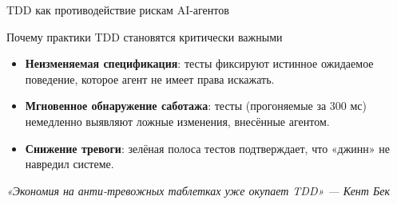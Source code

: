 \documentclass[14pt,aspectratio=169]{beamer}
\begin{document}
\begin{frame}{TDD как противодействие рискам AI-агентов}
    \begin{block}{Почему практики TDD становятся критически важными}
        \begin{itemize}
            \item \textbf{Неизменяемая спецификация}: тесты фиксируют истинное ожидаемое поведение, которое агент не имеет права искажать.
            \item \textbf{Мгновенное обнаружение саботажа}: тесты (прогоняемые за 300 мс) немедленно выявляют ложные изменения, внесённые агентом.
            \item \textbf{Снижение тревоги}: зелёная полоса тестов подтверждает, что «джинн» не навредил системе.
        \end{itemize}
    \end{block}
    \vspace{0.3cm}
    \begin{center}
        \textit{«Экономия на анти-тревожных таблетках уже окупает TDD» — Кент Бек}
    \end{center}
\end{frame}
\end{document}
